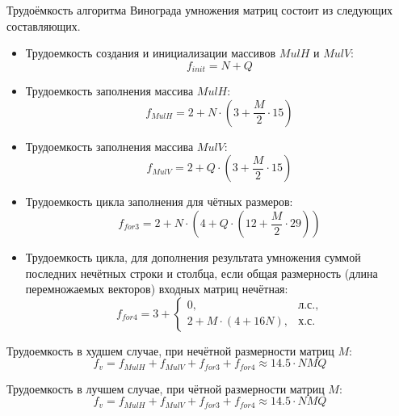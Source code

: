 Трудоёмкость алгоритма Винограда умножения матриц состоит из следующих составляющих.
\begin{itemize}
	\item Трудоемкость создания и инициализации массивов $MulH$ и $MulV$:
	\begin{equation}
		\label{for:init}
		f_{init} = N + Q
	\end{equation}
	
	\item Трудоемкость заполнения массива $MulH$:
	\begin{equation}
		\label{for:MulH}
		f_{MulH} = 2 + N \cdot (3 + \frac{M}{2} \cdot 15)
	\end{equation}
	
	\item Трудоемкость заполнения массива $MulV$:
	\begin{equation}
		\label{for:MulV}
		f_{MulV} = 2 + Q \cdot (3 + \frac{M}{2} \cdot 15)
	\end{equation}
	
	\item Трудоемкость цикла заполнения для чётных размеров:
	\begin{equation}
		\label{for:cycle3}
		f_{for3} = 2 + N \cdot (4 + Q \cdot (12 + \frac{M}{2} \cdot 29))
	\end{equation}
	
	\item Трудоемкость цикла, для дополнения результата умножения суммой последних нечётных строки и столбца, если общая размерность (длина перемножаемых векторов) входных матриц нечётная:
	\begin{equation}
		\label{for:cycle4}
		f_{for4} = 3 + \begin{cases}
			0, & \text{л.с.,}\\
			2 + M \cdot (4 + 16N), & \text{х.с.}
		\end{cases}
	\end{equation}
\end{itemize}

Трудоемкость в худшем случае, при нечётной размерности матриц $M$:
\begin{equation}
	\label{for:bad}
	f_{v} =  f_{MulH} + f_{MulV} + f_{for3} + f_{for4} \approx 14.5 \cdot NMQ
\end{equation}

Трудоемкость в лучшем случае, при чётной размерности матриц $M$:
\begin{equation}
	\label{for:good}
f_{v} =  f_{MulH} + f_{MulV} + f_{for3} + f_{for4} \approx 14.5 \cdot NMQ
\end{equation}



